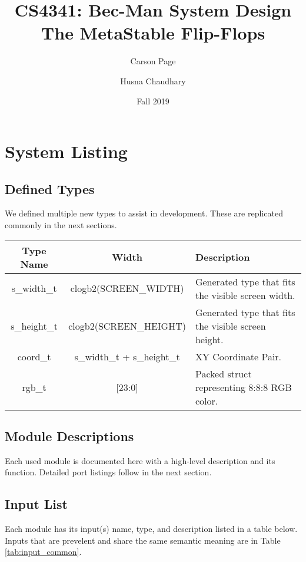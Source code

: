 \documentclass[12pt]{article}
\title{
    CS4341: Bec-Man System Design \\
    \large The MetaStable Flip-Flops}
\author{Carson Page \and Husna Chaudhary}
\date{Fall 2019}
\begin{document}
\begin{titlepage}
    \maketitle
\end{titlepage}
\tableofcontents
\newpage

\setlength{\parskip}{1em}

\section{System Listing}
\subsection{Defined Types}

We defined multiple new types to assist in development. These are replicated
commonly in the next sections.

\begin{tabularx}{\linewidth}{ ||c|c|X|| }
    \hline
    Type Name   & Width     & Description \\
    \hline
    s\_width\_t & clogb2(SCREEN\_WIDTH) & Generated type that fits the visible
    screen width. \\
    s\_height\_t & clogb2(SCREEN\_HEIGHT)  & Generated type that fits the visible
    screen height. \\
    coord\_t     &  s\_width\_t + s\_height\_t & XY Coordinate Pair. \\
    rgb\_t      & [23:0]    & Packed struct representing 8:8:8 RGB color. \\
    \hline
\end{tabularx}

\subsection{Module Descriptions}
Each used module is documented here with a high-level description and its
function. Detailed port listings follow in the next section.

\subsection{Input List}
Each module has its input(s) name, type, and description listed in a table
below. Inputs that are prevelent and share the same semantic meaning are in Table
\ref{tab:input_common}.
\end{document}
